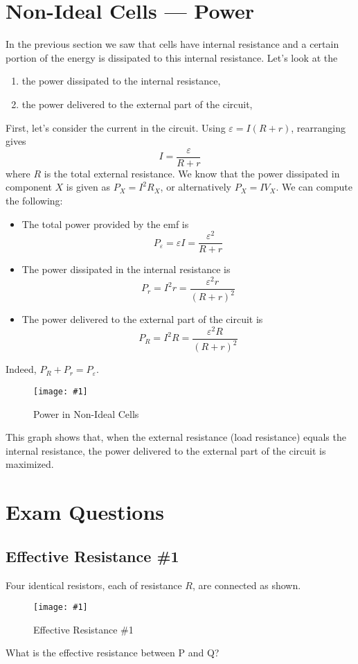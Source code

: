 \documentclass[a4paper,12pt]{article}
\let\oldsection\section
\renewcommand\section{\clearpage\oldsection}
\newcommand{\img}[4]{\begin{center}
  \begin{figure}[H]
    \centering
    \texttt{[image: \#1]}
    \caption{#3}
    \label{fig:#4}
  \end{figure}
\end{center}}
\begin{document}
\section{Non-Ideal Cells --- Power}

In the previous section we saw that cells have internal resistance and a certain portion of the energy is dissipated to this internal resistance. Let's look at the
\begin{enumerate}
  \item the power dissipated to the internal resistance,
  \item the power delivered to the external part of the circuit,
\end{enumerate}
First, let's consider the current in the circuit. Using $\varepsilon = I(R + r)$, rearranging gives
\begin{equation}
  I = \frac{\varepsilon}{R + r}
\end{equation}
where $R$ is the total external resistance.
We know that the power dissipated in component $X$ is given as $P_X = I^2R_X$,
or alternatively $P_X = IV_X$.
We can compute the following:
\begin{itemize}
  \item The total power provided by the emf is $$P_{\varepsilon} = \varepsilon I = \frac{\varepsilon^2}{R + r}$$
  \item The power dissipated in the internal resistance is $$P_r = I^2r = \frac{\varepsilon^2r}{(R + r)^2}$$
  \item The power delivered to the external part of the circuit is $$P_{R} = I^2R = \frac{\varepsilon^2R}{(R + r)^2}$$
\end{itemize}
Indeed, $P_R + P_r = P_{\varepsilon}$.

\pagebreak

\img{peakre.png}{0.7}{Power in Non-Ideal Cells}{power}

This graph shows that, when the external resistance (load resistance) equals the internal resistance, the power delivered to the external part of the circuit is maximized.

\pagebreak

\section{Exam Questions}

\subsection{Effective Resistance \#1}
Four identical resistors, each of resistance $R$, are connected as shown.
\img{ex/1.png}{0.4}{Effective Resistance \#1}{ex1}
What is the effective resistance between P and Q?
\end{document}

